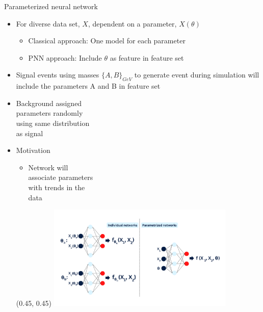 \documentclass[UKenglish]{beamer}
\begin{document}
\begin{frame}{Parameterized neural network}
    \begin{itemize}
        \item For diverse data set, $X$, dependent on a parameter, $X(\theta)$
        \begin{itemize}
            \item Classical approach: One model for each parameter
            \item PNN approach: Include $\theta$ as feature in feature set
        \end{itemize}
        \item Signal events using masses $\{A,B\}_{GeV}$ to generate 
        event during simulation will include the parameters A and B
        in feature set
        \item Background assigned \\
        parameters randomly \\
        using same distribution\\ 
        as signal
        \item Motivation
        \begin{itemize}
            \item Network will \\
            associate parameters\\
            with trends in the \\
            data
        \end{itemize}
        \begin{textblock}{0.8}(0.45, 0.45)
            \includegraphics[width = 0.7\textwidth]{figures/PNN.png}
        \end{textblock}
    \end{itemize}
\end{frame}
\end{document}
